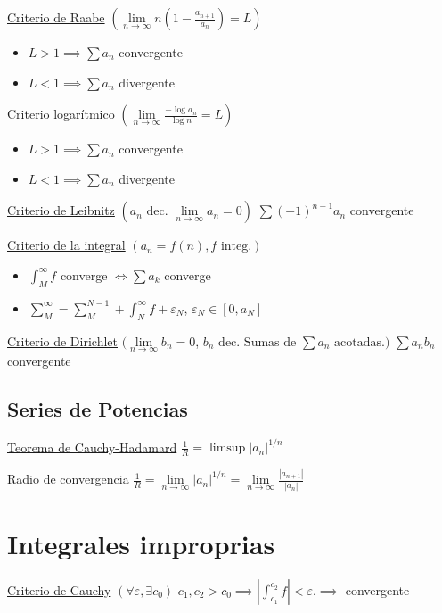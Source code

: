 \documentclass[12pt]{article}
\newcommand{\abs}[1]{\left\vert #1 \right\vert}
\begin{document}
\begin{multicols}{3}
	\underline{Criterio de Raabe}
	$\left( \lim\limits_{n \to \infty} n \left(1 - \frac{a_{n+1}}{a_n}\right)= L \right)$
	\begin{itemize}
		\item $L > 1 \implies \sum a_n$ convergente
		\item $L < 1 \implies \sum a_n$ divergente
	\end{itemize}
	
	\underline{Criterio logarítmico}
	$\left( \lim\limits_{n \to \infty} \frac{-\log{a_n}}{\log{n}} = L \right)$
	\begin{itemize}
		\item $L > 1 \implies \sum a_n$ convergente
		\item $L < 1 \implies \sum a_n$ divergente
	\end{itemize}
	
	\underline{Criterio de Leibnitz} $\left( a_n \text{ dec. } \lim\limits_{n \to \infty}
	a_n = 0 \right)$
	$\sum (-1)^{n+1} a_n$ convergente
	
	\underline{Criterio de la integral} $\left( a_n = f(n), f \text{ integ.} \right)$
	\begin{itemize}
		\item $\int_{M}^{\infty} f$ converge $\iff \sum a_k$ converge
		\item $\sum\limits_{M}^{\infty} = \sum\limits_{M}^{N-1} + \int_{N}^{\infty} f
		+ \varepsilon_N$, $\varepsilon_N \in [0,a_N]$
	\end{itemize}
	
	\underline{Criterio de Dirichlet} $(\lim\limits_{n\to \infty} b_n = 0$, $b_n \text{ dec. Sumas de } \sum a_n
	\text{ acotadas.})$
	$\sum a_nb_n$ convergente
	
	\subsection{Series de Potencias}
	
	\underline{Teorema de Cauchy-Hadamard}
	$\frac{1}{R} = \limsup \abs{a_n}^{1/n}$
	
	\underline{Radio de convergencia}
	$\frac{1}{R} = \lim\limits_{n \to \infty} \abs{a_n}^{1/n} = 
	\lim\limits_{n \to \infty} \frac{\abs{a_{n+1}}}{\abs{a_n}}$
	
	\section{Integrales improprias}
	
	\underline{Criterio de Cauchy} $\left( \forall \varepsilon, \exists c_0 \right)$
	$c_1, c_2 > c_0 \implies \abs{\int_{c_1}^{c_2} f} < \varepsilon. \implies$ convergente
	

\end{multicols}
\end{document}
